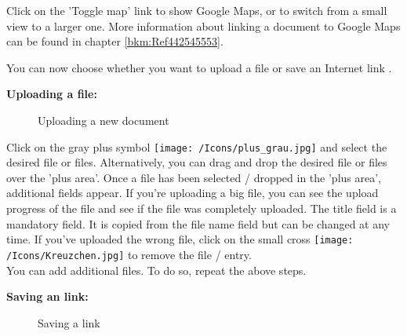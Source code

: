 Click on the 'Toggle map' link  to show Google Maps, or to switch from a small view to a larger one. More information about linking a document to Google Maps can be found in chapter \ref{bkm:Ref442545553}. \newline

You can now choose whether you want to upload a file  or save an Internet link .

\vspace{\baselineskip}

\textbf{Uploading a file:} 
\begin{figure}[H]
\caption{Uploading a new document}
\end{figure}

Click on the gray plus symbol \texttt{[image: /Icons/plus\_grau.jpg]}  and select the desired file or files. Alternatively, you can drag and drop the desired file or files over the 'plus area'. Once a file has been selected / dropped in the 'plus area', additional fields  appear. If you're uploading a big file, you can see the upload progress of the file  and see if the file was completely uploaded. The title field is a mandatory field. It is copied from the file name field  but can be changed at any time. If you've uploaded the wrong file, click on the small cross \texttt{[image: /Icons/Kreuzchen.jpg]}  to remove the file / entry. \\
You can add additional files. To do so, repeat the above steps. 

\vspace{\baselineskip}

\textbf{Saving an link:} 
\begin{figure}[H]
\caption{Saving a link}
\end{figure}

